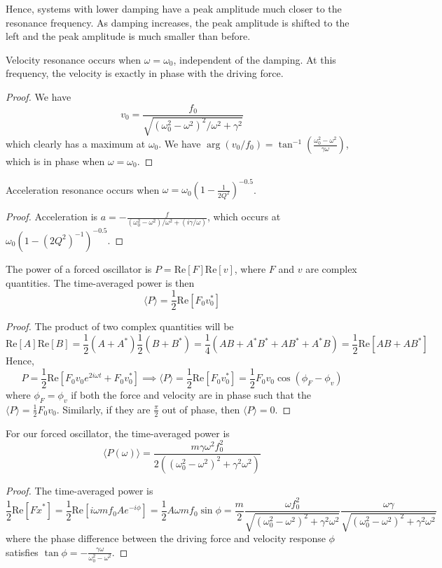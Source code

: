\documentclass[a4paper]{article}
\begin{document}
Hence, systems with lower damping have a peak amplitude much closer to the resonance frequency. As damping increases, the peak amplitude is shifted to the left and the peak amplitude is much smaller than before.
\begin{cor}
Velocity resonance occurs when $\omega=\omega_0$, independent of the damping. At this frequency, the velocity is exactly in phase with the driving force.
\end{cor}
\begin{proof}
We have
$$v_0=\frac{f_0}{\sqrt{(\omega_0^2-\omega^2)^2/\omega^2+\gamma^2}}$$
which clearly has a maximum at $\omega_0$. We have $\arg(v_0/f_0)=\tan^{-1}(\frac{\omega_0^2-\omega^2}{\gamma\omega})$, which is in phase when $\omega=\omega_0$.
\end{proof}
\begin{cor}
Acceleration resonance occurs when $\omega=\omega_0(1-\frac{1}{2Q^2})^{-0.5}$.
\end{cor}
\begin{proof}
Acceleration is $a=-\frac{f}{(\omega_0^2-\omega^2)/\omega^2+(i\gamma/\omega)}$, which occurs at $\omega_0(1-(2Q^2)^{-1})^{-0.5}$.
\end{proof}
\begin{thm}
The power of a forced oscillator is $P=\text{Re}[F]\text{Re}[v]$, where $F$ and $v$ are complex quantities. The time-averaged power is then
$$\langle P\rangle=\frac{1}{2}\text{Re}[F_0v_0^*]$$
\end{thm}
\begin{proof}
The product of two complex quantities will be
$$\text{Re}[A]\text{Re}[B]=\frac{1}{2}(A+A^*)\frac{1}{2}(B+B^*)=\frac{1}{4}(AB+A^*B^*+AB^*+A^*B)=\frac{1}{2}\text{Re}[AB+AB^*]$$
Hence,
$$P=\frac{1}{2}\text{Re}[F_0v_0e^{2i\omega t}+F_0v_0^*]\implies\langle P\rangle=\frac{1}{2}\text{Re}[F_0v_0^*]=\frac{1}{2}F_0v_0\cos(\phi_F-\phi_v)$$
where $\phi_F=\phi_v$ if both the force and velocity are in phase such that the $\langle P\rangle=\frac{1}{2}F_0v_0$. Similarly, if they are $\frac{\pi}{2}$ out of phase, then $\langle P\rangle=0$.
\end{proof}
\begin{cor}
For our forced oscillator, the time-averaged power is
$$\langle P(\omega)\rangle=\frac{m\gamma\omega^2f_0^2}{2((\omega_0^2-\omega^2)^2+\gamma^2\omega^2)}$$
\end{cor}
\begin{proof}
The time-averaged power is
$$\frac{1}{2}\text{Re}[F\dot{x}^*]=\frac{1}{2}\text{Re}[i\omega mf_0Ae^{-i\phi}]=\frac{1}{2}A\omega m f_0\sin\phi=\frac{m}{2}\frac{\omega f_0^2}{\sqrt{(\omega_0^2-\omega^2)^2+\gamma^2\omega^2}}\frac{\omega\gamma}{\sqrt{(\omega_0^2-\omega^2)^2+\gamma^2\omega^2}}$$
where the phase difference between the driving force and velocity response $\phi$ satisfies $\tan\phi=-\frac{\gamma\omega}{\omega_0^2-\omega^2}$.
\end{proof}
\end{document}
